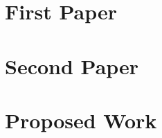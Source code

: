 \documentclass[11pt]{report}
\numberwithin{equation}{section}
\begin{document}


\newpage

\chapter{First Paper}



\newpage

\chapter{Second Paper}



\newpage

\chapter{Proposed Work}



\newpage

\begin{small}


\end{small}
\end{document}
